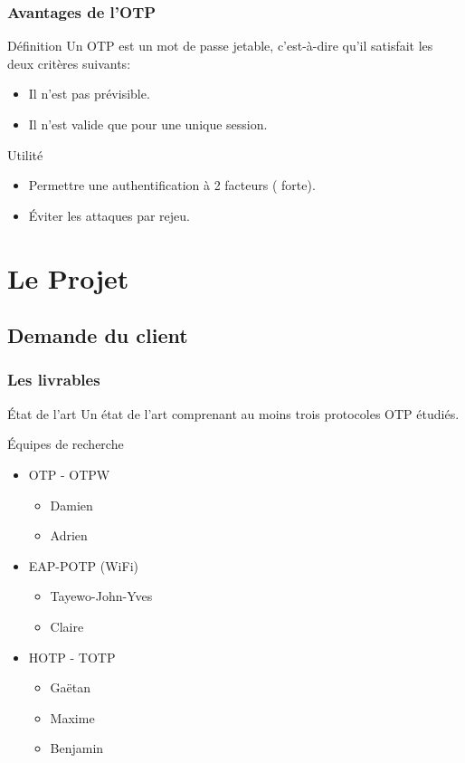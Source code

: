 \documentclass[xcolor=table]{beamer}
\begin{document}
\begin{frame}
\frametitle{Avantages de l'OTP}
\begin{block}{Définition}
    Un OTP est un mot de passe jetable, c'est-à-dire qu'il satisfait les deux 
  critères suivants:
  \begin{itemize}
    \item Il n'est pas prévisible.
    \item Il n'est valide que pour une unique session.
  \end{itemize}
\end{block}

\begin{block}{Utilité}
  \begin{itemize}
    \item Permettre une authentification à 2 facteurs (\og{} forte\fg{}).
    \item Éviter les attaques par rejeu.
  \end{itemize}
\end{block}
\end{frame}

\section{Le Projet}

\subsection{Demande du client}

\begin{frame}
\frametitle{Les livrables}
\begin{block}{État de l'art} 
Un état de l'art comprenant au moins trois protocoles OTP étudiés.
\end{block}
\begin{block}{Équipes de recherche}
  \begin{itemize}
      \item OTP - OTPW
    \begin{itemize}
      \item Damien 
      \item Adrien 
    \end{itemize}
    \item EAP-POTP (WiFi)
    \begin{itemize}
      \item Tayewo-John-Yves 
      \item Claire 
    \end{itemize}
    \item HOTP - TOTP
    \begin{itemize}
      \item Gaëtan 
      \item Maxime 
      \item Benjamin 
    \end{itemize}
  \end{itemize}
\end{block}
\end{frame}
\end{document}
